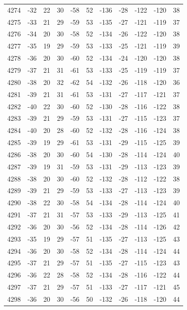 \begin{table}[H]
\begin{tabular}{lllllllllll}
4274 & -32 & 22 & 30 & -58 & 52 & -136 & -28 & -122 & -120 & 38 \\
4275 & -33 & 21 & 29 & -59 & 53 & -135 & -27 & -121 & -119 & 37 \\
4276 & -34 & 20 & 30 & -58 & 52 & -134 & -26 & -122 & -120 & 38 \\
4277 & -35 & 19 & 29 & -59 & 53 & -133 & -25 & -121 & -119 & 39 \\
4278 & -36 & 20 & 30 & -60 & 52 & -134 & -24 & -120 & -120 & 38 \\
4279 & -37 & 21 & 31 & -61 & 53 & -133 & -25 & -119 & -119 & 37 \\
4280 & -38 & 20 & 32 & -62 & 54 & -132 & -26 & -118 & -120 & 36 \\
4281 & -39 & 21 & 31 & -61 & 53 & -131 & -27 & -117 & -121 & 37 \\
4282 & -40 & 22 & 30 & -60 & 52 & -130 & -28 & -116 & -122 & 38 \\
4283 & -39 & 21 & 29 & -59 & 53 & -131 & -27 & -115 & -123 & 37 \\
4284 & -40 & 20 & 28 & -60 & 52 & -132 & -28 & -116 & -124 & 38 \\
4285 & -39 & 19 & 29 & -61 & 53 & -131 & -29 & -115 & -125 & 39 \\
4286 & -38 & 20 & 30 & -60 & 54 & -130 & -28 & -114 & -124 & 40 \\
4287 & -39 & 19 & 31 & -59 & 53 & -131 & -29 & -113 & -123 & 39 \\
4288 & -38 & 20 & 30 & -60 & 52 & -132 & -28 & -112 & -122 & 38 \\
4289 & -39 & 21 & 29 & -59 & 53 & -133 & -27 & -113 & -123 & 39 \\
4290 & -38 & 22 & 30 & -58 & 54 & -134 & -28 & -114 & -124 & 40 \\
4291 & -37 & 21 & 31 & -57 & 53 & -133 & -29 & -113 & -125 & 41 \\
4292 & -36 & 20 & 30 & -56 & 52 & -134 & -28 & -114 & -126 & 42 \\
4293 & -35 & 19 & 29 & -57 & 51 & -135 & -27 & -113 & -125 & 43 \\
4294 & -36 & 20 & 30 & -58 & 52 & -134 & -28 & -114 & -124 & 44 \\
4295 & -37 & 21 & 29 & -57 & 51 & -135 & -27 & -115 & -123 & 43 \\
4296 & -36 & 22 & 28 & -58 & 52 & -134 & -28 & -116 & -122 & 44 \\
4297 & -37 & 21 & 29 & -57 & 51 & -133 & -27 & -117 & -121 & 45 \\
4298 & -36 & 20 & 30 & -56 & 50 & -132 & -26 & -118 & -120 & 44 \\

\end{tabular}
\end{table}
